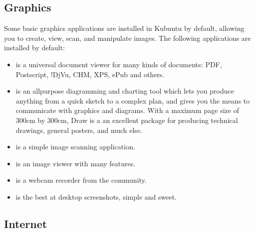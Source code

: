 \documentclass[letterpaper,10pt,english]{sphinxmanual}
\begin{document}
\subsection{Graphics}
\label{\detokenize{docs/software-management/software:graphics}}
\sphinxAtStartPar
Some basic graphics applications are installed in Kubuntu by default, allowing you to create, view, scan, and manipulate images. The following applications are installed by default:
\begin{itemize}
\item {} 
\sphinxAtStartPar
{} is a universal document viewer for many kinds of documents: PDF, Postscript, !DjVu, CHM, XPS, ePub and others.

\item {} 
\sphinxAtStartPar
{} is an all\sphinxhyphen{}purpose diagramming and charting tool which lets you produce anything from a quick sketch to a complex plan, and gives you the means to communicate with graphics and diagrams. With a maximum page size of 300cm by 300cm, Draw is a an excellent package for producing technical drawings, general posters, and much else.

\item {} 
\sphinxAtStartPar
{} is a simple image scanning application.

\item {} 
\sphinxAtStartPar
{} is an image viewer with many features.

\item {} 
\sphinxAtStartPar
{} is a webcam recorder from the  community.

\item {} 
\sphinxAtStartPar
{} is the best at desktop screenshots, simple and sweet.

\end{itemize}


\subsection{Internet}
\label{\detokenize{docs/software-management/software:internet}}
\end{document}

